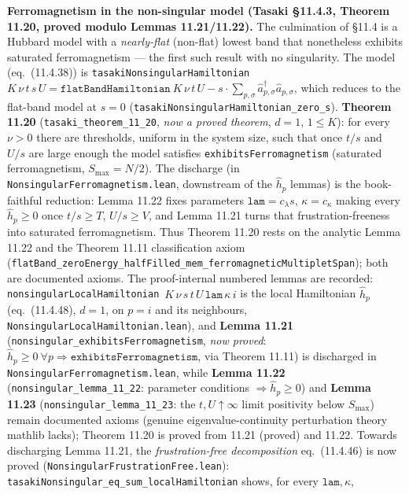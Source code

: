 \documentclass[a4paper,11pt]{article}
\begin{document}
\medskip\noindent\textbf{Ferromagnetism in the non-singular model (Tasaki §11.4.3,
Theorem 11.20, proved modulo Lemmas 11.21/11.22).}  The culmination of §11.4 is a Hubbard model with a
\emph{nearly-flat} (non-flat) lowest band that nonetheless exhibits saturated ferromagnetism
--- the first such result with no singularity.  The model (eq.~(11.4.38)) is
\texttt{tasakiNonsingularHamiltonian}~$K\,\nu\,t\,s\,U =
\texttt{flatBandHamiltonian}~K\,\nu\,t\,U - s\cdot\sum_{p,\sigma}\hat a^\dagger_{p,\sigma}\hat a_{p,\sigma}$,
which reduces to the flat-band model at $s=0$ (\texttt{tasakiNonsingularHamiltonian\_zero\_s}).
\textbf{Theorem 11.20} (\texttt{tasaki\_theorem\_11\_20}, \emph{now a proved theorem}, $d=1$,
$1\le K$): for every $\nu>0$ there are thresholds, uniform in the system size, such that once $t/s$
and $U/s$ are large enough the model satisfies \texttt{exhibitsFerromagnetism} (saturated
ferromagnetism, $S_{\max}=N/2$).  The discharge (in \texttt{NonsingularFerromagnetism.lean},
downstream of the $\hat h_p$ lemmas) is the book-faithful reduction: Lemma 11.22 fixes parameters
$\mathtt{lam}=c_\lambda s$, $\kappa=c_\kappa$ making every $\hat h_p\ge0$ once $t/s\ge T$, $U/s\ge V$,
and Lemma 11.21 turns that frustration-freeness into saturated ferromagnetism.  Thus Theorem 11.20
rests on the analytic Lemma 11.22 and the Theorem 11.11 classification axiom
(\texttt{flatBand\_zeroEnergy\_halfFilled\_mem\_ferromagneticMultipletSpan}); both are documented
axioms.  The proof-internal numbered lemmas are recorded:
\texttt{nonsingularLocalHamiltonian}~$K\,\nu\,s\,t\,U\,\mathtt{lam}\,\kappa\,i$ is the local
Hamiltonian $\hat h_p$ (eq.~(11.4.48), $d=1$, on $p=i$ and its neighbours,
\texttt{NonsingularLocalHamiltonian.lean}), and
\textbf{Lemma 11.21} (\texttt{nonsingular\_exhibitsFerromagnetism}, \emph{now proved}:
$\hat h_p\ge0\ \forall p \Rightarrow \texttt{exhibitsFerromagnetism}$, via Theorem 11.11) is
discharged in \texttt{NonsingularFerromagnetism.lean}, while \textbf{Lemma 11.22}
(\texttt{nonsingular\_lemma\_11\_22}: parameter conditions $\Rightarrow \hat h_p\ge0$) and
\textbf{Lemma 11.23} (\texttt{nonsingular\_lemma\_11\_23}: the $t,U\uparrow\infty$ limit
positivity below $S_{\max}$) remain documented axioms (genuine eigenvalue-continuity perturbation
theory mathlib lacks); Theorem 11.20 is proved from 11.21 (proved) and 11.22.
Towards discharging Lemma 11.21, the \emph{frustration-free decomposition} eq.~(11.4.46) is now
proved (\texttt{NonsingularFrustrationFree.lean}): \texttt{tasakiNonsingular\_eq\_sum\_localHamiltonian}
shows, for every $\mathtt{lam},\kappa$,
\end{document}

